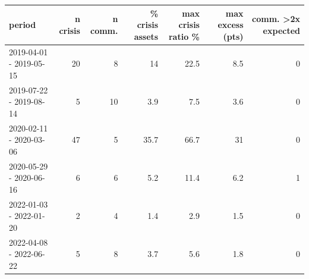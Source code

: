 \begin{tabular}{lrrrrrr}
\toprule
period & n crisis & n comm. & \% crisis assets & max crisis ratio \% & max excess (pts) & comm. >2x expected \\
\midrule
2019-04-01 - 2019-05-15 & 20 & 8 & 14 & 22.5 & 8.5 & 0 \\
2019-07-22 - 2019-08-14 & 5 & 10 & 3.9 & 7.5 & 3.6 & 0 \\
2020-02-11 - 2020-03-06 & 47 & 5 & 35.7 & 66.7 & 31 & 0 \\
2020-05-29 - 2020-06-16 & 6 & 6 & 5.2 & 11.4 & 6.2 & 1 \\
2022-01-03 - 2022-01-20 & 2 & 4 & 1.4 & 2.9 & 1.5 & 0 \\
2022-04-08 - 2022-06-22 & 5 & 8 & 3.7 & 5.6 & 1.8 & 0 \\
\bottomrule
\end{tabular}
